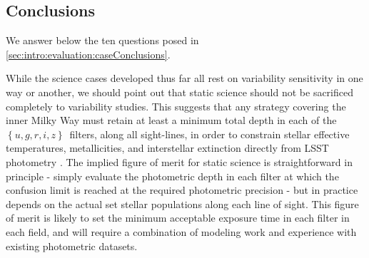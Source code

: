 %
\subsection{Conclusions}


We answer below the ten questions posed in \autoref{sec:intro:evaluation:caseConclusions}.

While the science cases developed thus far all rest on
  variability sensitivity in one way or another, we should point out
  that static science should not be sacrificed completely to
  variability studies. This suggests that any strategy covering the
  inner Milky Way must retain at least a minimum total depth in each
  of the $\left\{u,g,r,i,z\right\}$~filters, along all sight-lines, in
  order to constrain stellar effective temperatures, metallicities,
  and interstellar extinction directly from LSST photometry \citep[see
    for example the presentation in][and associated
    papers]{ivezic08}. The implied figure of merit for static science
  is straightforward in principle - simply evaluate the photometric
  depth in each filter at which the confusion limit is reached at the
  required photometric precision - but in practice depends on the
  actual set stellar populations along each line of sight. This figure of
  merit is likely to set the minimum acceptable exposure time in each
  filter in each field, and will require a combination of modeling
  work and experience with existing photometric datasets.

